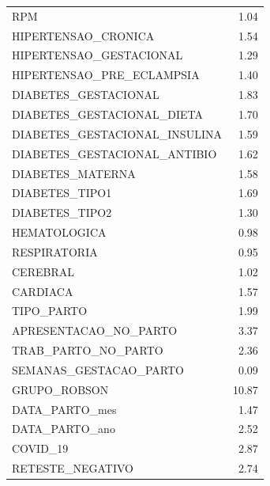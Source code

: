 \documentclass{article}
\begin{document}
\begin{longtable}{lr}
RPM                           &  1.04 \\
HIPERTENSAO\_CRONICA           &  1.54 \\
HIPERTENSAO\_GESTACIONAL       &  1.29 \\
HIPERTENSAO\_PRE\_ECLAMPSIA     &  1.40 \\
DIABETES\_GESTACIONAL          &  1.83 \\
DIABETES\_GESTACIONAL\_DIETA    &  1.70 \\
DIABETES\_GESTACIONAL\_INSULINA &  1.59 \\
DIABETES\_GESTACIONAL\_ANTIBIO  &  1.62 \\
DIABETES\_MATERNA              &  1.58 \\
DIABETES\_TIPO1                &  1.69 \\
DIABETES\_TIPO2                &  1.30 \\
HEMATOLOGICA                  &  0.98 \\
RESPIRATORIA                  &  0.95 \\
CEREBRAL                      &  1.02 \\
CARDIACA                      &  1.57 \\
TIPO\_PARTO                    &  1.99 \\
APRESENTACAO\_NO\_PARTO         &  3.37 \\
TRAB\_PARTO\_NO\_PARTO           &  2.36 \\
SEMANAS\_GESTACAO\_PARTO        &  0.09 \\
GRUPO\_ROBSON                  & 10.87 \\
DATA\_PARTO\_mes                &  1.47 \\
DATA\_PARTO\_ano                &  2.52 \\
COVID\_19                      &  2.87 \\
RETESTE\_NEGATIVO              &  2.74 \\
\end{longtable}
\end{document}
